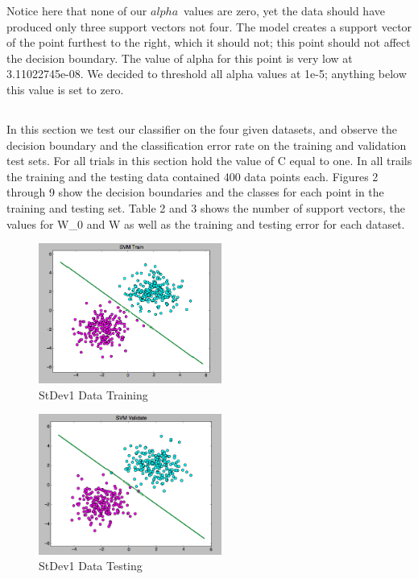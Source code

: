 \documentclass[pageno]{jpaper}
\begin{document}
Notice here that none of our $alpha$\ values are zero, yet the data should have produced only three support vectors not four. The model creates a support vector of the point furthest to the right, which it should not; this point should not affect the decision boundary. The value of alpha for this point is very low at 3.11022745e-08. We decided to threshold all alpha values at 1e-5; anything below this value is set to zero.

\subsection{}
In this section we test our classifier on the four given datasets, and observe the decision boundary and the classification error rate on the training and validation test sets. For all trials in this section hold the value of C equal to one. In all trails the training and the testing data contained 400 data points each. 
Figures 2 through 9 show the decision boundaries and the classes for each point in the training and testing set. Table 2 and 3 shows the number of support vectors, the values for W\_0 and W as well as the training and testing error for each dataset.

\begin{figure}[ht!]
\centering
\includegraphics[width=60mm]{stdev1_train}
\caption{StDev1 Data Training}
\label{overflow}
\end{figure}

\begin{figure}[ht!]
\centering
\includegraphics[width=60mm]{stdev1_test}
\caption{StDev1 Data Testing}
\label{overflow}
\end{figure}
\end{document}
